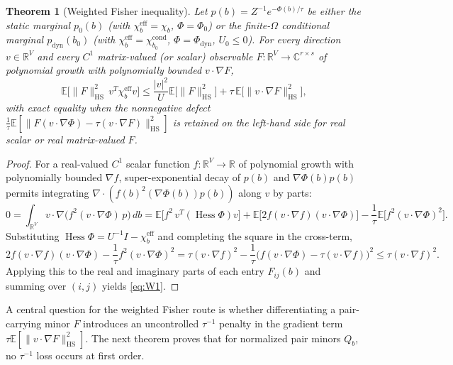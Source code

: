 \documentclass[11pt]{article}
\newtheorem{theorem}{Theorem}[section]
\theoremstyle{definition}
\theoremstyle{remark}
\DeclareMathOperator{\Hess}{Hess}
\DeclareMathOperator{\HS}{HS}
\DeclareMathOperator{\cond}{cond}
\DeclareMathOperator{\dyn}{dyn}
\newcommand{\E}{\mathbb{E}}
\newcommand{\R}{\mathbb{R}}
\newcommand{\C}{\mathbb{C}}
\begin{document}
\begin{theorem}[Weighted Fisher inequality]
\label{thm:W1}
Let $p(b) = Z^{-1} e^{-\Phi(b)/\tau}$ be either the static marginal $p_0(b)$ (with $\chi_b^{\mathrm{eff}} = \chi_b$, $\Phi = \Phi_0$) or the finite-$\Omega$ conditional marginal $p_{\dyn}(b_0)$ (with $\chi_b^{\mathrm{eff}} = \chi_{b_0}^{\cond}$, $\Phi = \Phi_{\dyn}$, $U_0 \le 0$). For every direction $v \in \R^V$ and every $C^1$ matrix-valued (or scalar) observable $F: \R^V \to \C^{r \times s}$ of polynomial growth with polynomially bounded $v\cdot\nabla F$,
\begin{equation}
\E\bigl[\|F\|_{\HS}^2\, v^T \chi_b^{\mathrm{eff}} v\bigr]
\le \frac{|v|^2}{U}\E\bigl[\|F\|_{\HS}^2\bigr] + \tau\,\E\bigl[\|v\cdot\nabla F\|_{\HS}^2\bigr],
\label{eq:W1}
\end{equation}
with exact equality when the nonnegative defect $\frac{1}{\tau}\E[\|F(v\cdot\nabla\Phi) - \tau(v\cdot\nabla F)\|_{\HS}^2]$ is retained on the left-hand side for real scalar or real matrix-valued $F$.
\end{theorem}

\begin{proof}
For a real-valued $C^1$ scalar function $f: \R^V \to \R$ of polynomial growth with polynomially bounded $\nabla f$, super-exponential decay of $p(b)$ and $\nabla\Phi(b) p(b)$ permits integrating $\nabla \cdot (f(b)^2 (\nabla\Phi(b)) p(b))$ along $v$ by parts:
\[
0 = \int_{\R^V} v\cdot\nabla\bigl(f^2 (v\cdot\nabla\Phi)\,p\bigr)\,db
= \E\bigl[f^2\, v^T(\Hess\Phi)v\bigr] + \E\bigl[2f (v\cdot\nabla f)(v\cdot\nabla\Phi)\bigr] - \frac{1}{\tau}\E\bigl[f^2 (v\cdot\nabla\Phi)^2\bigr].
\]
Substituting $\Hess\Phi = U^{-1} I - \chi_b^{\mathrm{eff}}$ and completing the square in the cross-term,
\[
2f(v\cdot\nabla f)(v\cdot\nabla\Phi) - \frac{1}{\tau} f^2 (v\cdot\nabla\Phi)^2
= \tau (v\cdot\nabla f)^2 - \frac{1}{\tau}\bigl(f(v\cdot\nabla\Phi) - \tau(v\cdot\nabla f)\bigr)^2 \le \tau (v\cdot\nabla f)^2.
\]
Applying this to the real and imaginary parts of each entry $F_{ij}(b)$ and summing over $(i,j)$ yields \eqref{eq:W1}.
\end{proof}

A central question for the weighted Fisher route is whether differentiating a pair-carrying minor $F$ introduces an uncontrolled $\tau^{-1}$ penalty in the gradient term $\tau \E[\|v\cdot\nabla F\|_{\HS}^2]$. The next theorem proves that for normalized pair minors $Q_b$, no $\tau^{-1}$ loss occurs at first order.
\end{document}
